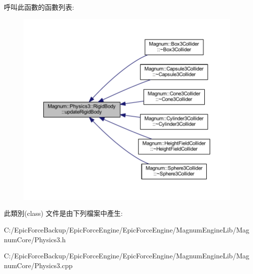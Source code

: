呼叫此函數的函數列表\+:\nopagebreak
\begin{figure}[H]
\begin{center}
\leavevmode
\includegraphics[width=350pt]{class_magnum_1_1_physics3_1_1_rigid_body_ae5b00d6e2ba30c69459263846b84ea59_icgraph}
\end{center}
\end{figure}




此類別(class) 文件是由下列檔案中產生\+:\begin{DoxyCompactItemize}
\item 
C\+:/\+Epic\+Force\+Backup/\+Epic\+Force\+Engine/\+Epic\+Force\+Engine/\+Magnum\+Engine\+Lib/\+Magnum\+Core/Physics3.\+h\item 
C\+:/\+Epic\+Force\+Backup/\+Epic\+Force\+Engine/\+Epic\+Force\+Engine/\+Magnum\+Engine\+Lib/\+Magnum\+Core/Physics3.\+cpp\end{DoxyCompactItemize}
